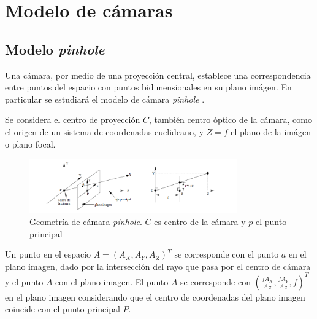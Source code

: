 ﻿\chapter{Modelo de cámaras}

\section{Modelo \emph{pinhole}}



Una cámara, por medio de una proyección central, establece una correspondencia entre puntos del espacio con puntos bidimensionales en su plano imágen. En particular se estudiará el modelo de cámara \emph{pinhole} \cite{LibroCompGrafica3}.

Se considera el centro de proyección $C$, también centro óptico de la cámara, como el origen de un sistema de coordenadas euclideano, y $Z = f$ el plano de la imágen o plano focal.

\begin{figure}[H]
  \centering
    \includegraphics[width=0.8\textwidth]{./Cap2_videomapping/pinhole.png}
  \caption{Geometría de cámara \emph{pinhole}. $C$ es centro de la cámara y $p$ el punto principal}
  \label{fig:Calib-Pinhole}
\end{figure}

Un punto en el espacio $A=(A_X, A_Y, A_Z)^T$ se corresponde con el punto $a$ en el plano imagen, dado por la intersección del rayo que pasa por el centro de cámara y el punto $A$ con el plano imagen. El punto $A$ se corresponde con $(\frac{fA_X}{A_Z}, \frac{fA_Y}{A_Z}, f)^T$ en el plano imagen considerando que el centro de coordenadas del plano imagen coincide con el punto principal $P$.

